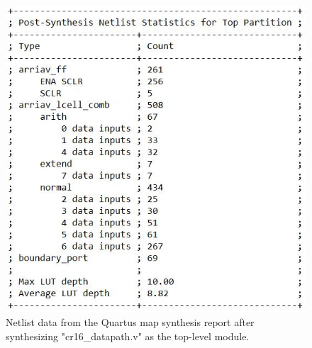 \documentclass[conference]{IEEEtran}
\begin{document}
\begin{figure}[h]
    \centering
    \includegraphics[scale=0.5]{resources/figures/analysis_and_synthesis_netlist.JPG}
    \caption{Netlist data from the Quartus map synthesis report after synthesizing "cr16\_datapath.v" as the top-level module.}
    \label{fig:datapath_analysis_netlist}
\end{figure}
\end{document}
